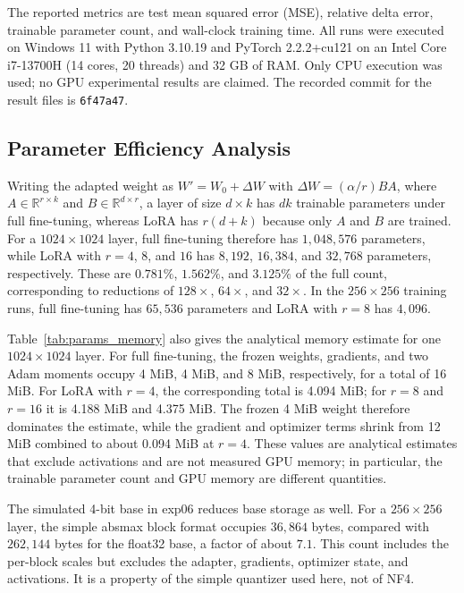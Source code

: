 The reported metrics are test mean squared error (MSE), relative delta error, trainable parameter count, and wall-clock training time. All runs were executed on Windows 11 with Python 3.10.19 and PyTorch 2.2.2+cu121 on an Intel Core i7-13700H (14 cores, 20 threads) and 32 GB of RAM. Only CPU execution was used; no GPU experimental results are claimed. The recorded commit for the result files is \texttt{6f47a47}.

\subsection{Parameter Efficiency Analysis}

Writing the adapted weight as $W'=W_0+\Delta W$ with $\Delta W=(\alpha/r)BA$, where $A\in\mathbb{R}^{r\times k}$ and $B\in\mathbb{R}^{d\times r}$, a layer of size $d\times k$ has $dk$ trainable parameters under full fine-tuning, whereas LoRA has $r(d+k)$ because only $A$ and $B$ are trained. For a $1024\times1024$ layer, full fine-tuning therefore has $1{,}048{,}576$ parameters, while LoRA with $r=4$, $8$, and $16$ has $8{,}192$, $16{,}384$, and $32{,}768$ parameters, respectively. These are $0.781\%$, $1.562\%$, and $3.125\%$ of the full count, corresponding to reductions of $128\times$, $64\times$, and $32\times$. In the $256\times256$ training runs, full fine-tuning has $65{,}536$ parameters and LoRA with $r=8$ has $4{,}096$.



Table~\ref{tab:params_memory} also gives the analytical memory estimate for one $1024\times1024$ layer. For full fine-tuning, the frozen weights, gradients, and two Adam moments occupy 4 MiB, 4 MiB, and 8 MiB, respectively, for a total of 16 MiB. For LoRA with $r=4$, the corresponding total is 4.094 MiB; for $r=8$ and $r=16$ it is 4.188 MiB and 4.375 MiB. The frozen 4 MiB weight therefore dominates the estimate, while the gradient and optimizer terms shrink from 12 MiB combined to about 0.094 MiB at $r=4$. These values are analytical estimates that exclude activations and are not measured GPU memory; in particular, the trainable parameter count and GPU memory are different quantities.

The simulated 4-bit base in exp06 reduces base storage as well. For a $256\times256$ layer, the simple absmax block format occupies $36{,}864$ bytes, compared with $262{,}144$ bytes for the float32 base, a factor of about $7.1$. This count includes the per-block scales but excludes the adapter, gradients, optimizer state, and activations. It is a property of the simple quantizer used here, not of NF4.

